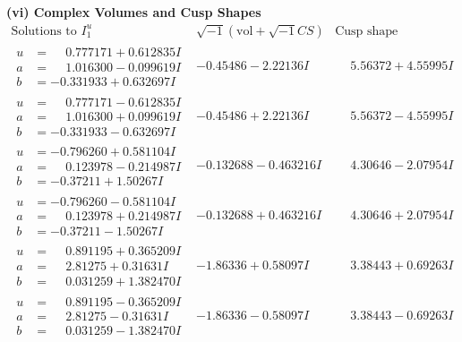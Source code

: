 \documentclass[1p]{elsarticle_modified}
\theoremstyle{definition}
\newcommand{\I}{\sqrt{-1}}
\begin{document}
\newpage\flushleft \textbf{(vi) Complex Volumes and Cusp Shapes}
$$\begin{array}{c|c|c}  
\text{Solutions to }I^u_{1}& \I (\text{vol} + \sqrt{-1}CS) & \text{Cusp shape}\\
 \hline 
\begin{aligned}
u &= \phantom{-}0.777171 + 0.612835 I \\
a &= \phantom{-}1.016300 - 0.099619 I \\
b &= -0.331933 + 0.632697 I\end{aligned}
 & -0.45486 - 2.22136 I & \phantom{-}5.56372 + 4.55995 I \\ \hline\begin{aligned}
u &= \phantom{-}0.777171 - 0.612835 I \\
a &= \phantom{-}1.016300 + 0.099619 I \\
b &= -0.331933 - 0.632697 I\end{aligned}
 & -0.45486 + 2.22136 I & \phantom{-}5.56372 - 4.55995 I \\ \hline\begin{aligned}
u &= -0.796260 + 0.581104 I \\
a &= \phantom{-}0.123978 - 0.214987 I \\
b &= -0.37211 + 1.50267 I\end{aligned}
 & -0.132688 - 0.463216 I & \phantom{-}4.30646 - 2.07954 I \\ \hline\begin{aligned}
u &= -0.796260 - 0.581104 I \\
a &= \phantom{-}0.123978 + 0.214987 I \\
b &= -0.37211 - 1.50267 I\end{aligned}
 & -0.132688 + 0.463216 I & \phantom{-}4.30646 + 2.07954 I \\ \hline\begin{aligned}
u &= \phantom{-}0.891195 + 0.365209 I \\
a &= \phantom{-}2.81275 + 0.31631 I \\
b &= \phantom{-}0.031259 + 1.382470 I\end{aligned}
 & -1.86336 + 0.58097 I & \phantom{-}3.38443 + 0.69263 I \\ \hline\begin{aligned}
u &= \phantom{-}0.891195 - 0.365209 I \\
a &= \phantom{-}2.81275 - 0.31631 I \\
b &= \phantom{-}0.031259 - 1.382470 I\end{aligned}
 & -1.86336 - 0.58097 I & \phantom{-}3.38443 - 0.69263 I \\ \hline\begin{aligned}

\end{aligned}
\end{array}$$
\end{document}
